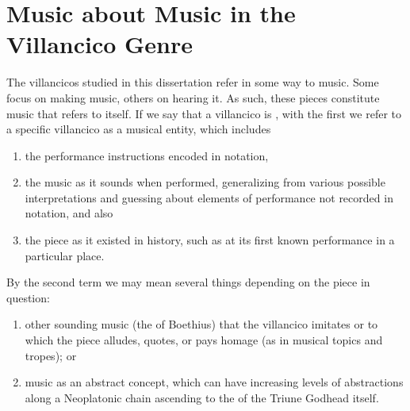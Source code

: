




\section{Music about Music in the Villancico Genre}

The villancicos studied in this dissertation refer in some way to music.
Some focus on making music, others on hearing it.
As such, these pieces constitute music that refers to itself.
If we say that a villancico is , with the first  we refer to a specific villancico as a musical entity, which includes 
\begin{enumerate}
\item the performance instructions encoded in notation,
\item the music as it sounds when performed, generalizing from various possible interpretations and guessing about elements of performance not recorded in notation, and also
\item the piece as it existed in history, such as at its first known performance in a particular place.
\end{enumerate}
%
By the second term  we may mean several things depending on the piece in question: 
\begin{enumerate}
\item other sounding music (the  of Boethius) that the villancico imitates or to which the piece alludes, quotes, or pays homage (as in musical topics and tropes); or 
\item music as an abstract concept, which can have increasing levels of abstractions along a Neoplatonic chain ascending to the  of the Triune Godhead itself.
\end{enumerate}

